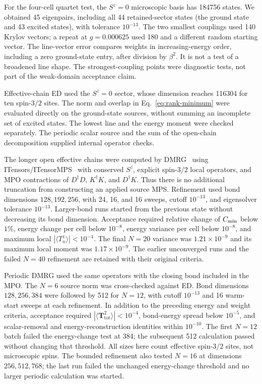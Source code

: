 For the four-cell quartet test, the $S^z=0$ microscopic basis has 184756
states. We obtained 45 eigenpairs, including all 44 retained-sector states
(the ground state and 43 excited states), with tolerance $10^{-13}$.
The two smallest couplings used 140 Krylov vectors; a repeat at
$g=0.000625$ used 180 and a different random starting vector. The line-vector
error compares weights in increasing-energy order, including a zero
ground-state entry, after division by $\beta^2$. It is not a test of a
broadened line shape. The strongest-coupling points were diagnostic tests,
not part of the weak-domain acceptance claim.

Effective-chain ED used the $S^z=0$ sector, whose dimension reaches 116304
for ten spin-$3/2$ sites. The norm and overlap in
Eq.~\eqref{eq:rank-minimum} were evaluated directly on the ground-state
sources, without summing an incomplete set of excited states. The lowest
line and the energy moment were checked separately. The periodic scalar
source and the sum of the open-chain decomposition supplied internal
operator checks.

The longer open effective chains were computed by DMRG~\cite{white1992,schollwoeck2011}
using ITensors/ITensorMPS~\cite{fishman2022}
with conserved $S^z$, explicit spin-$3/2$ local operators, and MPO contractions
of $D^\dagger D$, $K^\dagger K$, and $D^\dagger K$. Thus there is no additional
truncation from constructing an applied source MPS. Refinement used bond
dimensions $128,192,256$, with 24, 16, and 16 sweeps, cutoff $10^{-13}$,
and eigensolver tolerance $10^{-13}$. Larger-bond runs started from the
previous state without decreasing its bond dimension. Acceptance required
relative change of $C_{\mathrm{min}}$ below $1\%$, energy change per cell below
$10^{-8}$, energy variance per cell below $10^{-8}$, and maximum local
$|\langle T_n^z\rangle|<10^{-4}$. The final $N=20$ variance was
$1.21\times10^{-9}$ and its maximum local moment was $1.17\times10^{-9}$.
The earlier unconverged runs and the failed $N=40$ refinement are retained
with their original criteria.

Periodic DMRG used the same operators with the closing bond included in the
MPO. The $N=6$ source norm was cross-checked against ED. Bond dimensions
$128,256,384$ were followed by 512 for $N=12$, with cutoff $10^{-13}$ and
16 warm-start sweeps at each refinement. In addition to the preceding
energy and weight criteria, acceptance required
$|\langle\bm T_{\mathrm{tot}}^2\rangle|<10^{-4}$, bond-energy spread below
$10^{-5}$, and scalar-removal and energy-reconstruction identities within
$10^{-10}$. The first $N=12$ batch failed the energy-change test at 384;
the subsequent 512 calculation passed without changing that threshold.
All sizes here count effective spin-$3/2$ sites, not microscopic spins.
The bounded refinement also tested $N=16$ at dimensions $256,512,768$;
the last run failed the unchanged energy-change threshold and no larger
periodic calculation was started.

